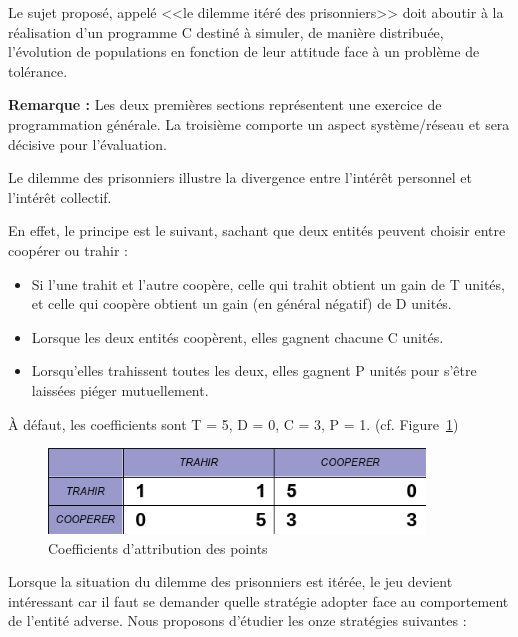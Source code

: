 \documentclass[11pt]{article}
\newcommand{\titreprojet}{Le dilemme du prisonnier}
\begin{document}
\entete{\titreprojet}

\begin{introduction}
 Le sujet proposé, appelé <<le dilemme itéré des prisonniers>> doit aboutir à la réalisation d'un programme C destiné à simuler, de manière distribuée, l'évolution de populations en fonction de leur attitude face à un problème de tolérance.
\end{introduction}

\noindent
\textbf{Remarque :} Les deux premières sections représentent une exercice
de programmation générale. La troisième comporte un aspect système/réseau
et sera décisive pour l'évaluation. 

\bigskip

Le dilemme des prisonniers illustre la divergence entre l'intérêt personnel et l'intérêt collectif. 

En effet, le principe est le suivant, sachant que deux entités peuvent choisir entre coopérer ou trahir : 

\begin{itemize}
\item Si l'une trahit et l'autre coopère, celle qui trahit obtient un gain de T unités, et celle qui coopère obtient un gain (en général négatif) de D unités.

\item Lorsque les deux entités coopèrent, elles gagnent chacune C unités.

\item Lorsqu'elles trahissent toutes les deux, elles gagnent P unités pour s'être laissées piéger mutuellement. 
\end{itemize}

À défaut, les coefficients sont T = 5, D = 0, C = 3, P = 1. (cf. Figure~\ref{Coefs})

\begin{figure}[h]
 \centerline{\includegraphics[width=10cm]{array.png}}
 \caption{Coefficients d'attribution des points}
 \label{Coefs}
\end{figure}

Lorsque la situation du dilemme des prisonniers est itérée, le jeu devient intéressant car il faut se demander quelle stratégie adopter face au comportement de l'entité adverse. Nous proposons d'étudier les onze stratégies suivantes : 
\end{document}
